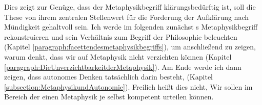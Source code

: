 \begin{comment}
Und als paradigmatisch für eine verbreitete Auffassung kann eine Behauptung
\authorfullcite{Schnaedelbach:WirKantianer2005}s gelten:
\begin{quote}
Hinter dem \singlequote{alles zermalmenden Kant}, der die herkömmliche Metaphysik in Grund
und Boden kritisiert, wird allzu leicht der Begründer einer kritischen
Metaphysik der Natur und der Sitten übersehen. Das Neue daran ist, dass diese
neue Metaphysik ohne Gottesbezug auszukommen versucht -- ein für die
metaphysische Tradition unfassbarer Gedanke. {\punkt} der rationalen Theologie
ging es ja nicht um Religion, sondern um die Existenz einer Instanz, die mit der
Einheit der Welt auch ihre Erkennbarkeit sichert; so schien Metaphysik nur
möglich zu sein in der Perspektive des Gottesstandpunktes. Nach Kant gibt es
Metaphysik nur nach menschlichem Maß, das heißt nach Maßgabe der menschlichen
Vernunft, und daran vermochte die philosophische Episode des \singlequote{deutschen
Idealismus}, der Kant nicht angehört, nichts zu
ändern.\footcite[][837]{Schnaedelbach:WirKantianer2005}
\end{quote}
\name[Immanuel]{Kant}s \singlequote{kritische} Metaphysik unterscheide sich also
darin von anderen, dass sie nicht auf eine Erkenntnis Gottes als Basis unserer
Geltungsansprüche zurückgreife. Während beispielsweise
\authorcite{Descartes:OeuvresdeDescartes1983} glaubt, zunächst die
Existenz Gottes beweisen zu müssen, auf dieser Grundlage dann aber zeigen zu
können, dass alles, was wir klar und deutlich einsehen, unzweifelhaft wahr sein
müsse, verwerfe \name[Immanuel]{Kant} gerade den Gedanken einer solchen
\singlequote{metaphysischen} Fundierung. Damit entfalle aber auch die
gedankliche Möglichkeit eines Wissens \emph{sub specie aeternitatis}, eines
absoluten Wissens. Die Endlichkeit unseres Erkennens lässt sich demnach nicht
mehr durch metaphysische Überlegungen überwinden.
\end{comment}

Dies zeigt zur Genüge, dass der Metaphysikbegriff klärungsbedürftig ist, soll
die These von ihrem zentralen Stellenwert für die Forderung der Aufklärung nach
Mündigkeit gehaltvoll sein. Ich werde im folgenden zunächst
s Metaphysikbegriff rekonstruieren und sein Verhältnis zum Begriff
der Philosophie beleuchten (Kapitel \ref{paragraph:facettendesmetaphysikbegriffs}),
um anschließend zu zeigen, warum  denkt, dass wir auf
Metaphysik nicht verzichten können (Kapitel
\ref{paragraph:DieUnverzichtbarkeitderMetaphysik}). Am Ende werde ich dann
zeigen, dass autonomes Denken tatsächlich darin besteht,  (Kapitel
\ref{subsection:MetaphysikundAutonomie}). Freilich heißt dies nicht,
 Wir sollen im Bereich der einen
Metaphysik je selbst kompetent urteilen können.

